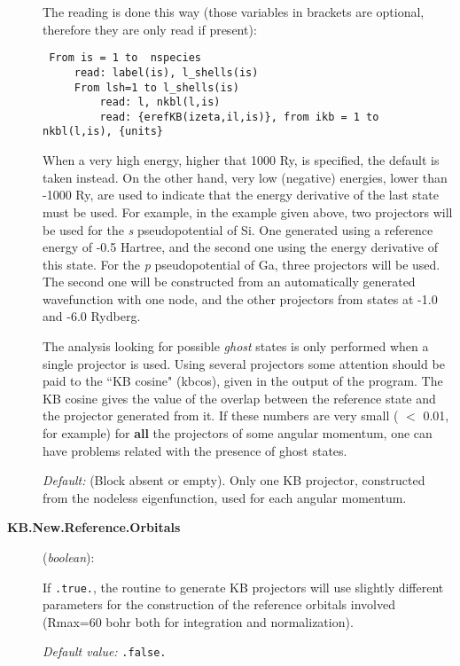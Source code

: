 \documentclass[11pt]{article}
\begin{document}
\begin{description}
The reading is done this way (those variables in brackets are optional,
therefore they are only read if
present):

\begin{verbatim}
 From is = 1 to  nspecies
     read: label(is), l_shells(is)
     From lsh=1 to l_shells(is)
         read: l, nkbl(l,is)
         read: {erefKB(izeta,il,is)}, from ikb = 1 to nkbl(l,is), {units}
\end{verbatim}

When a very high energy, higher that 1000 Ry, is specified, the
default is taken instead.  On the other hand, very low (negative)
energies, lower than -1000 Ry, are used to indicate that the energy
derivative of the last state must be used. For example, in the example
given above, two projectors will be used for the {\it s}
pseudopotential of Si. One generated using a reference energy of -0.5
Hartree, and the second one using the energy derivative of this
state. For the {\it p} pseudopotential of Ga, three projectors will be
used.  The second one will be constructed from an automatically
generated wavefunction with one node, and the other projectors from
states at -1.0 and -6.0 Rydberg.

The analysis looking for possible {\it ghost} states is only performed
when a single projector is used.  Using several projectors some
attention should be paid to the ``KB cosine" (kbcos), given in the
output of the program.  The KB cosine gives the value of the overlap
between the reference state and the projector generated from it.  If
these numbers are very small ( $<$ 0.01, for example) for {\bf all}
the projectors of some angular momentum, one can have problems related
with the presence of ghost states.

{\it Default:} (Block absent or empty). Only one KB projector,
constructed from the nodeless eigenfunction, used for each angular
momentum.
\noindent

\item[{\bf KB.New.Reference.Orbitals}] ({\it boolean}):

If {\tt .true.}, the routine to generate KB projectors will use
slightly different parameters for the construction of the reference
orbitals involved (Rmax=60 bohr both for integration and
normalization).

{\it Default value:} {\tt .false.}

\end{description}
\end{document}
